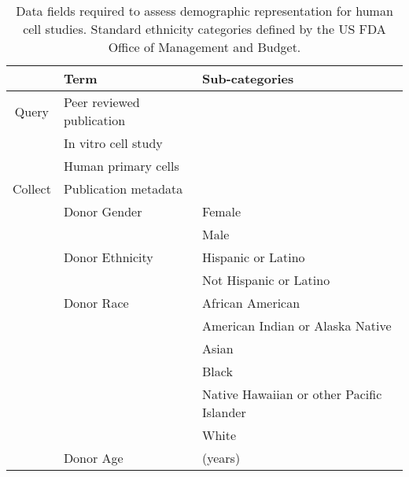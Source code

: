 \documentclass[10pt]{article}
\begin{document}
\begin{table}[b!]
\caption{Data fields required to assess demographic representation for human cell studies. Standard ethnicity categories defined by the US FDA Office of Management and Budget.}
\centering
\begin{tabular}{c l l }
\hline 
 & Term & Sub-categories  \\
\hline 
Query & Peer reviewed publication  &  \\
& In vitro cell study  &  \\
& Human primary cells &  \\
\hline
Collect & Publication metadata &  \\
 & Donor Gender & Female \\
 & & Male \\
 & Donor Ethnicity & Hispanic or Latino   \\
& & Not Hispanic or Latino  \\
 & Donor Race & African American\\
&& American Indian or Alaska Native  \\
&& Asian \\
&& Black \\
&& Native Hawaiian or other Pacific Islander \\ 
&& White   \\
 & Donor Age &  (years) \\
\hline
\end{tabular}
\label{table:DataFields}
\end{table}








\enddocument
\end{document}
